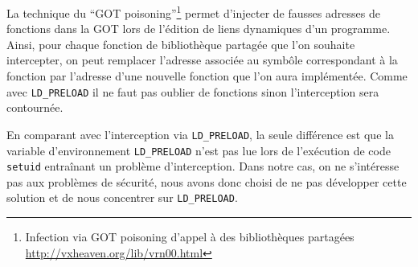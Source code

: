 La technique du ``GOT poisoning''\footnote{Infection via GOT poisoning d'appel à des bibliothèques partagées \\ \url{http://vxheaven.org/lib/vrn00.html}} permet d'injecter de fausses adresses de fonctions dans la GOT lors de l'édition de liens dynamiques d'un programme. Ainsi, pour chaque fonction de bibliothèque partagée que l'on souhaite intercepter, on peut remplacer l'adresse associée au symbôle correspondant à la fonction par l'adresse d'une nouvelle fonction que l'on aura implémentée. Comme avec \texttt{LD\_PRELOAD} il ne faut pas oublier de fonctions sinon l'interception sera contournée.

En comparant avec l'interception via \texttt{LD\_PRELOAD}, la seule différence est que la variable d'environnement \texttt{LD\_PRELOAD} n'est pas lue lors de l'exécution de code \texttt{setuid} entraînant un problème d'interception. Dans notre cas, on ne s'intéresse pas aux problèmes de sécurité, nous avons donc choisi de ne pas développer cette solution et de nous concentrer sur \texttt{LD\_PRELOAD}.

\vspace{0.5cm}
